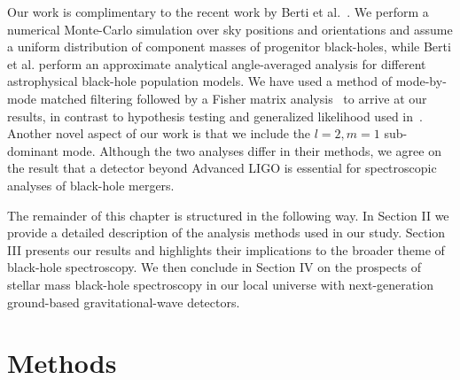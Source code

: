 Our work is complimentary to the recent work by Berti et al.~\cite{2016arXiv160509286B}. We perform a numerical Monte-Carlo simulation over sky positions and orientations and assume a uniform distribution of component masses of progenitor black-holes, while Berti et al. perform an approximate analytical angle-averaged analysis for different astrophysical black-hole population models. We have used a method of mode-by-mode matched filtering followed by a Fisher matrix analysis~\cite{van2004detection} to arrive at our results, in contrast to hypothesis testing and generalized likelihood used in~\cite{2016arXiv160509286B}. Another novel aspect of our work is that we include the $l=2, m=1$ sub-dominant mode. Although the two analyses differ in their methods, we agree on the result that a detector beyond Advanced LIGO is essential for spectroscopic analyses of black-hole mergers. 

The remainder of this chapter is structured in the following way. In Section II we provide a detailed description of the analysis methods used in our study. Section III presents our results and highlights their implications to the broader theme of black-hole spectroscopy. We then conclude in Section IV on the prospects of stellar mass black-hole spectroscopy in our local universe with next-generation ground-based gravitational-wave detectors.

\section{Methods}
\label{sec:framework}

